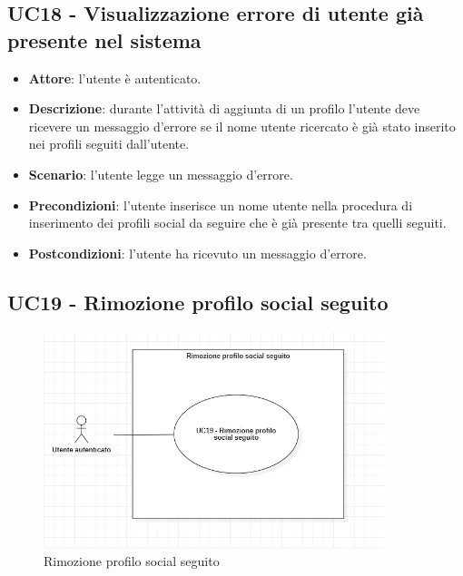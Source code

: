\subsection{UC18 - Visualizzazione errore di utente già presente nel sistema}
\begin{itemize}
    \item \textbf{Attore}: l'utente è autenticato.
    \item \textbf{Descrizione}: durante l'attività di aggiunta di un profilo l'utente deve ricevere un messaggio d'errore se il nome utente ricercato è già stato inserito nei profili seguiti dall'utente.
    \item \textbf{Scenario}: l'utente legge un messaggio d'errore. 
    \item \textbf{Precondizioni}: l'utente inserisce un nome utente nella procedura di inserimento dei profili social da seguire che è già presente tra quelli seguiti.
    \item \textbf{Postcondizioni}: l'utente ha ricevuto un messaggio d'errore.
\end{itemize}

\subsection{UC19 - Rimozione profilo social seguito}

\begin{figure}[!h]
    \includegraphics[width=10cm]{sezioni/Images/UC19.png}
    \centering
    \caption{Rimozione profilo social seguito}
\end{figure}

